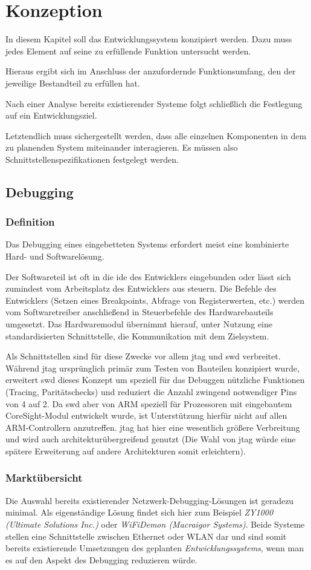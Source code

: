 \chapter{Konzeption}
\minitoc
In diesem Kapitel soll das Entwicklungssystem konzipiert werden.
Dazu muss jedes Element auf seine zu erfüllende Funktion untersucht werden.

Hieraus ergibt sich im Anschluss der anzufordernde Funktionsumfang, den der
jeweilige Bestandteil zu erfüllen hat.

Nach einer Analyse bereits existierender Systeme folgt schließlich die
Festlegung auf ein Entwicklungsziel.

Letztendlich muss sichergestellt werden, dass alle einzelnen Komponenten in dem
zu planenden System miteinander interagieren. Es müssen also
Schnittstellenspezifikationen festgelegt werden.
\section{Debugging}
\subsection{Definition}
Das Debugging eines eingebetteten Systems erfordert meist eine kombinierte Hard-
und Softwarelösung.

Der Softwareteil ist oft in die \gls{ide} des Entwicklers eingebunden oder lässt
sich zumindest vom Arbeitsplatz des Entwicklers aus steuern. Die Befehle des
Entwicklers (Setzen eines Breakpoints, Abfrage von Registerwerten, etc.) werden
vom Softwaretreiber anschließend in Steuerbefehle des Hardwarebauteils
umgesetzt. Das Hardwaremodul übernimmt hierauf, unter Nutzung eine
standardisierten Schnittstelle, die Kommunikation mit dem Zielsystem.

Als Schnittstellen sind für diese Zwecke vor allem \gls{jtag} und \gls{swd}
verbreitet. Während \gls{jtag} ursprünglich primär zum Testen von Bauteilen
konzipiert wurde, erweitert \gls{swd} dieses Konzept um speziell für das
Debuggen nützliche Funktionen (Tracing, Paritätschecks) und reduziert die Anzahl
zwingend notwendiger Pins von 4 auf 2. Da \gls{swd} aber von ARM speziell
für Prozessoren mit eingebautem CoreSight-Modul entwickelt wurde, ist
Unterstützung hierfür nicht auf allen ARM-Controllern anzutreffen. \gls{jtag}
hat hier eine wesentlich größere Verbreitung und wird auch
architekturübergreifend genutzt (Die Wahl von \gls{jtag} würde eine spätere
Erweiterung auf andere Architekturen somit erleichtern).
\subsection{Marktübersicht}
Die Auswahl bereits existierender Netzwerk-Debugging-Lösungen ist geradezu
minimal.
Als eigenständige Lösung findet sich hier zum Beispiel \emph{ZY1000 (Ultimate
Solutions Inc.)} oder \emph{WiFiDemon (Macraigor Systems)}. Beide Systeme
stellen eine Schnittstelle zwischen Ethernet oder WLAN dar und sind somit
bereits existierende Umsetzungen des geplanten \emph{Entwicklungssystems}, wenn
man es auf den Aspekt des Debugging reduzieren würde.

